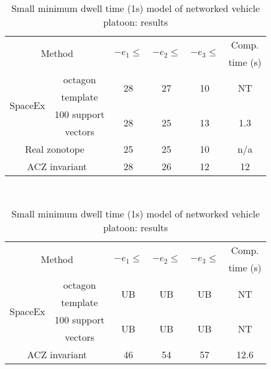 \begin{table}
\begin{minipage}{0.4\textwidth}
~\label{tab:largeinv-pdi}
\vspace{1em}
\end{minipage}
%
\begin{tabular}{|l|c|c|c|c|c|}
\hline
\multicolumn{2}{|c|}{\multirow{2}{*}{Method}} &
\multirow{2}{*}{$-e_1\leq$} & \multirow{2}{*}{$-e_2\leq$} & \multirow{2}{*}{$-e_3\leq$} & Comp.\\
\multicolumn{2}{|c|}{} & & & & time (s)\\
\hline
\multirow{4}{*}{SpaceEx} & octagon & \multirow{2}{*}{28} &
\multirow{2}{*}{27} & \multirow{2}{*}{10} &
\multirow{2}{*}{NT}\\
& template & & & & \\
\cline{2-6}
& 100 support & \multirow{2}{*}{28} & \multirow{2}{*}{25} &
\multirow{2}{*}{13} & \multirow{2}{*}{1.3}\\
& vectors & & & & \\
\hline
\multicolumn{2}{|c|}{\multirow{2}{*}{Real zonotope~\cite{makhlouf2014networked}}} &
\multirow{2}{*}{25} & \multirow{2}{*}{25} & \multirow{2}{*}{10}
 & \multirow{2}{*}{n/a}\\
\multicolumn{2}{|c|}{} & & & & \\
\hline
\multicolumn{2}{|c|}{\multirow{2}{*}{ACZ invariant}} &
\multirow{2}{*}{28} & \multirow{2}{*}{26} &
\multirow{2}{*}{12} & \multirow{2}{*}{12}\\
\multicolumn{2}{|c|}{} & & & &\\
\hline
\end{tabular}
\caption{Large minimum dwell time (20s) model of networked
  vehicle platoon: results}
~\label{tab:largedwell-platoon}
 $~$\\
\begin{tabular}{|l|c|c|c|c|c|}
\hline
\multicolumn{2}{|c|}{\multirow{2}{*}{Method}} &
\multirow{2}{*}{$-e_1\leq$} & \multirow{2}{*}{$-e_2\leq$} & \multirow{2}{*}{$-e_3\leq$} & Comp.\\
\multicolumn{2}{|c|}{} & & & & time (s)\\
\hline
\multirow{4}{*}{SpaceEx} & octagon & \multirow{2}{*}{UB} &
\multirow{2}{*}{UB} & \multirow{2}{*}{UB} &
\multirow{2}{*}{NT}\\
& template & & & & \\
\cline{2-6}
& 100 support & \multirow{2}{*}{UB} & \multirow{2}{*}{UB} &
\multirow{2}{*}{UB} & \multirow{2}{*}{NT}\\
& vectors & & & & \\
\hline
\multicolumn{2}{|c|}{\multirow{2}{*}{ACZ invariant}} &
\multirow{2}{*}{46} & \multirow{2}{*}{54} &
\multirow{2}{*}{57} & \multirow{2}{*}{12.6}\\
\multicolumn{2}{|c|}{} & & & &\\
\hline
\end{tabular}
\caption{Small minimum dwell time (1s) model of networked vehicle
  platoon: results}
~\label{tab:smalldwell-platoon}
\end{table}
%
